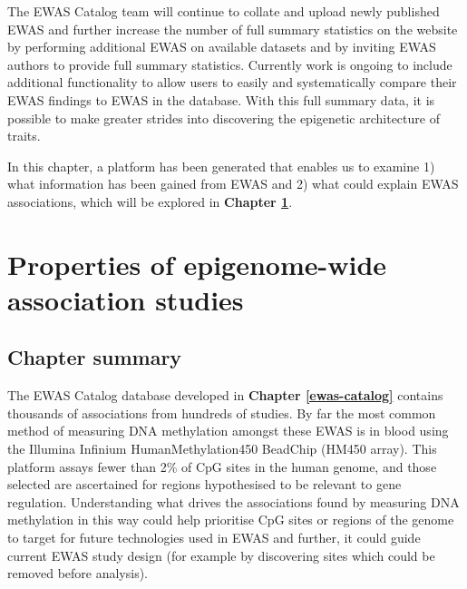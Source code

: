 \documentclass[11pt,twoside]{bristolthesis}
\begin{document}
The EWAS Catalog team will continue to collate and upload newly published EWAS and further increase the number of full summary statistics on the website by performing additional EWAS on available datasets and by inviting EWAS authors to provide full summary statistics. Currently work is ongoing to include additional functionality to allow users to easily and systematically compare their EWAS findings to EWAS in the database. With this full summary data, it is possible to make greater strides into discovering the epigenetic architecture of traits.

In this chapter, a platform has been generated that enables us to examine 1) what information has been gained from EWAS and 2) what could explain EWAS associations, which will be explored in \textbf{Chapter \ref{properties-of-ewas}}.

\hypertarget{properties-of-ewas}{%
\chapter{Properties of epigenome-wide association studies}\label{properties-of-ewas}}

\hypertarget{chapter-summary-04}{%
\section{Chapter summary}\label{chapter-summary-04}}

The EWAS Catalog database developed in \textbf{Chapter \ref{ewas-catalog}} contains thousands of associations from hundreds of studies. By far the most common method of measuring DNA methylation amongst these EWAS is in blood using the Illumina Infinium HumanMethylation450 BeadChip (HM450 array). This platform assays fewer than 2\% of CpG sites in the human genome, and those selected are ascertained for regions hypothesised to be relevant to gene regulation. Understanding what drives the associations found by measuring DNA methylation in this way could help prioritise CpG sites or regions of the genome to target for future technologies used in EWAS and further, it could guide current EWAS study design (for example by discovering sites which could be removed before analysis).
\end{document}

